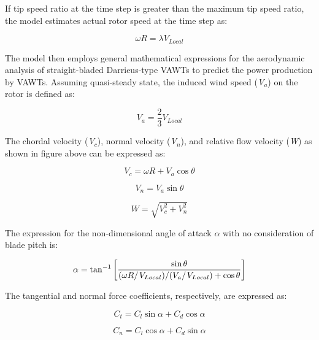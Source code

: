 If tip speed ratio at the time step is greater than the maximum tip speed ratio, the model estimates actual rotor speed at the time step as:

\begin{equation}
\omega R = \lambda {V_{Local}}
\end{equation}

The model then employs general mathematical expressions for the aerodynamic analysis of straight-bladed Darrieus-type VAWTs to predict the power production by VAWTs. Assuming quasi-steady state, the induced wind speed (\emph{V\(_{a}\)}) on the rotor is defined as:

\begin{equation}
{V_a} = \frac{2}{3}{V_{Local}}
\end{equation}

The chordal velocity (\emph{V\(_{c}\)}), normal velocity (\emph{V\(_{n}\)}), and relative flow velocity (\emph{W}) as shown in figure above can be expressed as:

\begin{equation}
{V_c} = \omega R + {V_a}\cos \theta
\end{equation}

\begin{equation}
{V_n} = {V_a}\sin \theta
\end{equation}

\begin{equation}
W = \sqrt {V_c^2 + V_n^2}
\end{equation}

The expression for the non-dimensional angle of attack \(\alpha\) with no consideration of blade pitch is:

\begin{equation}
\alpha  = {\tan ^{ - 1}}\left[ {\frac{{\sin \theta }}{{{{(\omega R} \mathord{\left/ {\vphantom {{(\omega R} {{V_{Local}})/({{{V_a}} \mathord{\left/ {\vphantom {{{V_a}} {{V_{Local}}}}} \right. } {{V_{Local}}}}}}} \right. } {{V_{Local}})/({{{V_a}} \mathord{\left/ {\vphantom {{{V_a}} {{V_{Local}}}}} \right. } {{V_{Local}}}}}}) + \cos \theta }}} \right]
\end{equation}

The tangential and normal force coefficients, respectively, are expressed as:

\begin{equation}
{C_t} = {C_l}\sin \alpha  + {C_d}\cos \alpha
\end{equation}

\begin{equation}
{C_n} = {C_l}\cos \alpha  + {C_d}\sin \alpha
\end{equation}

